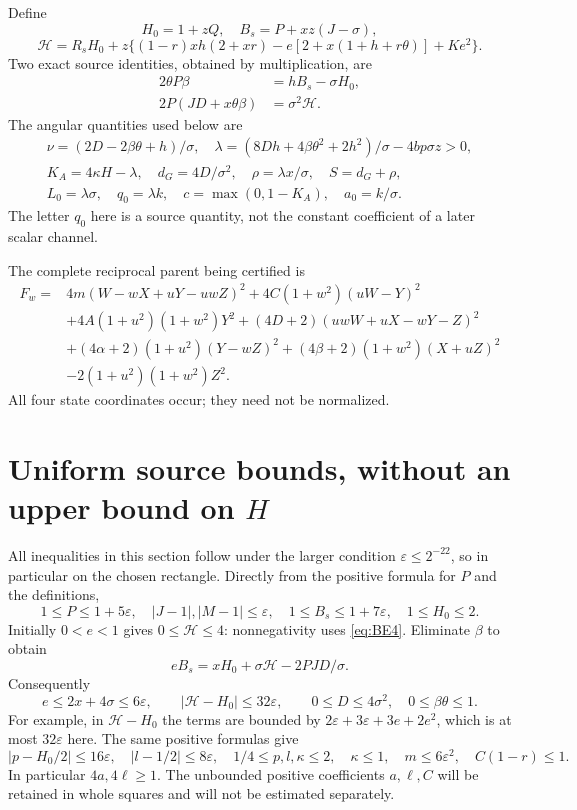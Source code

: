 \documentclass[11pt]{article}
\newcommand{\eps}{\varepsilon}
\begin{document}
Define
\[
 H_0=1+zQ,\quad B_s=P+xz(J-\sigma),
\]
\[
 \mathcal H=R_sH_0+z\{(1-r)xh(2+xr)
 -e[2+x(1+h+r\theta)]+Ke^2\}.
\]
Two exact source identities, obtained by multiplication, are
\begin{align}
 2\theta P\beta&=hB_s-\sigma H_0,\label{eq:BE3}\\
 2P(JD+x\theta\beta)&=\sigma^2\mathcal H.\label{eq:BE4}
\end{align}
The angular quantities used below are
\[
\begin{gathered}
 \nu=(2D-2\beta\theta+h)/\sigma,\quad
 \lambda=(8Dh+4\beta\theta^2+2h^2)/\sigma-4bp\sigma z>0,\\
 K_A=4\kappa H-\lambda,\quad d_G=4D/\sigma^2,
 \quad \rho=\lambda x/\sigma,\quad S=d_G+\rho,\\
 L_0=\lambda\sigma,\quad q_0=\lambda k,\quad
 c=\max(0,1-K_A),\quad a_0=k/\sigma.
\end{gathered}
\]
The letter $q_0$ here is a source quantity, not the constant
coefficient of a later scalar channel.

The complete reciprocal parent being certified is
\[
\begin{split}
 F_w={}&4m(W-wX+uY-uwZ)^2+4C(1+w^2)(uW-Y)^2\\
 &+4A(1+u^2)(1+w^2)Y^2
 +(4D+2)(uwW+uX-wY-Z)^2\\
 &+(4\alpha+2)(1+u^2)(Y-wZ)^2
 +(4\beta+2)(1+w^2)(X+uZ)^2\\
 &-2(1+u^2)(1+w^2)Z^2.
\end{split}
\]
All four state coordinates occur; they need not be normalized.

\section{Uniform source bounds, without an upper bound on $H$}

All inequalities in this section follow under the larger condition
$\eps\le2^{-22}$, so in particular on the chosen rectangle.
Directly from the positive formula for $P$ and the definitions,
\[
 1\le P\le1+5\eps,\quad |J-1|,|M-1|\le\eps,
 \quad 1\le B_s\le1+7\eps,\quad 1\le H_0\le2.
\]
Initially $0<e<1$ gives $0\le\mathcal H\le4$: nonnegativity
uses \eqref{eq:BE4}. Eliminate $\beta$ to obtain
\[
 eB_s=xH_0+\sigma\mathcal H-2PJD/\sigma.
\]
Consequently
\begin{equation}\label{eq:basic-bounds}
 e\le2x+4\sigma\le6\eps,\qquad
 |\mathcal H-H_0|\le32\eps,\qquad
 0\le D\le4\sigma^2,\quad 0\le\beta\theta\le1.
\end{equation}
For example, in $\mathcal H-H_0$ the terms are bounded by
$2\eps+3\eps+3e+2e^2$, which is at most $32\eps$ here.
The same positive formulas give
\begin{equation}\label{eq:p-bounds}
 |p-H_0/2|\le16\eps,\quad |l-1/2|\le8\eps,
 \quad 1/4\le p,l,\kappa\le2,
 \quad \kappa\le1,\quad m\le6\eps^2,
 \quad C(1-r)\le1.
\end{equation}
In particular $4a,4\ell\ge1$. The unbounded positive coefficients
$a,\ell,C$ will be retained in whole squares and will not be
estimated separately.
\end{document}
